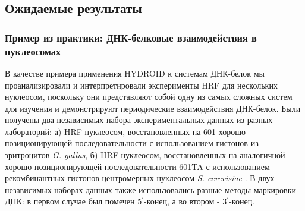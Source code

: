     \subsection{Ожидаемые результаты}
    
    \subsubsection{Пример из практики: ДНК-белковые взаимодействия в нуклеосомах}
    
    В качестве примера применения HYDROID к системам ДНК-белок мы проанализировали и интерпретировали эксперименты HRF для нескольких нуклеосом, поскольку они представляют собой одну из самых сложных систем для изучения и демонстрируют периодические взаимодействия ДНК-белок. Были получены два независимых набора экспериментальных данных из разных лабораторий: а) HRF нуклеосом, восстановленных на 601 хорошо позиционирующей последовательности \cite{lowary_new_1998} с использованием гистонов из эритроцитов \textit{G. gallus}, б) HRF нуклеосом, восстановленных на аналогичной хорошо позиционирующей последовательности 601TA \cite{cloutier_dna_2005} с использованием рекомбинантных гистонов центромерных нуклеосом \textit{S. cerevisiae} \cite{shaytan_hydroxyl-radical_2017}. В двух независимых наборах данных также использовались разные методы маркировки ДНК: в первом случае был помечен 5$^\prime$-конец, а во втором - 3$^\prime$-конец.
    
